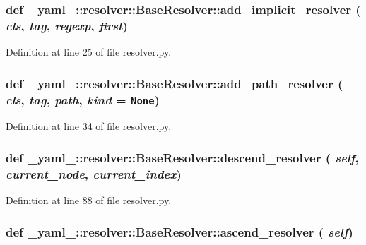 \subsubsection{\setlength{\rightskip}{0pt plus 5cm}def {\bf \_\-yaml\_\-::resolver::BaseResolver::add\_\-implicit\_\-resolver} ( {\em cls},  {\em tag},  {\em regexp},  {\em first})}\label{class__yaml___1_1resolver_1_1BaseResolver_f381e70e41323998cc5bcc641237df0a}




Definition at line 25 of file resolver.py.
\subsubsection{\setlength{\rightskip}{0pt plus 5cm}def {\bf \_\-yaml\_\-::resolver::BaseResolver::add\_\-path\_\-resolver} ( {\em cls},  {\em tag},  {\em path},  {\em kind} = {\tt None})}\label{class__yaml___1_1resolver_1_1BaseResolver_2f144712a23a525fdfa598caf85e2687}




Definition at line 34 of file resolver.py.
\subsubsection{\setlength{\rightskip}{0pt plus 5cm}def \_\-yaml\_\-::resolver::BaseResolver::descend\_\-resolver ( {\em self},  {\em current\_\-node},  {\em current\_\-index})}\label{class__yaml___1_1resolver_1_1BaseResolver_229226258f48f1b1d8936b7471e8ba86}




Definition at line 88 of file resolver.py.
\subsubsection{\setlength{\rightskip}{0pt plus 5cm}def \_\-yaml\_\-::resolver::BaseResolver::ascend\_\-resolver ( {\em self})}\label{class__yaml___1_1resolver_1_1BaseResolver_46f0fd2a11277dfa7a49c80924cfb726}





